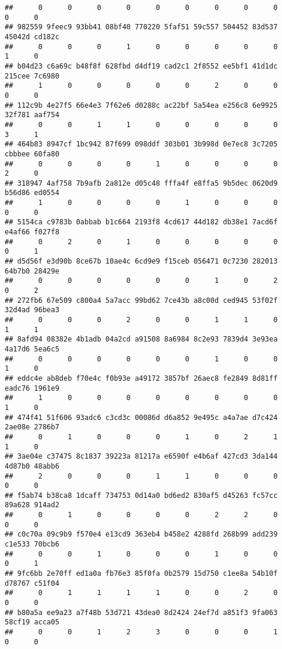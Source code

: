 \documentclass[
]{article}
\begin{document}
\begin{verbatim}
##      0      0      0      0      0      0      0      0      0      0      0 
## 982559 9feec9 93bb41 08bf40 770220 5faf51 59c557 504452 83d537 45042d cd182c 
##      0      0      0      1      0      0      0      0      0      1      0 
## b04d23 c6a69c b48f8f 628fbd d4df19 cad2c1 2f8552 ee5bf1 41d1dc 215cee 7c6980 
##      1      0      0      0      0      0      2      0      0      0      0 
## 112c9b 4e27f5 66e4e3 7f62e6 d0288c ac22bf 5a54ea e256c8 6e9925 32f781 aaf754 
##      0      0      1      1      0      0      0      0      0      3      1 
## 464b83 8947cf 1bc942 87f699 098ddf 303b01 3b998d 0e7ec8 3c7205 cbbbee 60fa80 
##      0      0      0      0      1      0      0      0      0      2      0 
## 318947 4af758 7b9afb 2a812e d05c48 fffa4f e8ffa5 9b5dec 0620d9 b56d86 ed0554 
##      1      0      0      0      0      1      0      0      0      0      0 
## 5154ca c9783b 0abbab b1c664 2193f8 4cd617 44d182 db38e1 7acd6f e4af66 f027f8 
##      0      2      0      1      0      0      0      0      0      0      1 
## d5d56f e3d90b 8ce67b 10ae4c 6cd9e9 f15ceb 056471 0c7230 282013 64b7b0 28429e 
##      0      0      0      0      0      0      1      0      2      0      2 
## 272fb6 67e509 c800a4 5a7acc 99bd62 7ce43b a8c00d ced945 53f02f 32d4ad 96bea3 
##      0      0      0      2      0      0      1      1      0      1      1 
## 8afd94 08382e 4b1adb 04a2cd a91508 8a6984 8c2e93 7839d4 3e93ea 4a17d6 5ea6c5 
##      0      0      0      0      0      0      1      0      0      1      0 
## eddc4e ab8deb f70e4c f0b93e a49172 3857bf 26aec8 fe2849 8d81ff eadc76 1961e9 
##      1      0      0      0      0      0      0      0      0      1      0 
## 474f41 51f606 93adc6 c3cd3c 00086d d6a852 9e495c a4a7ae d7c424 2ae08e 2786b7 
##      0      1      0      0      0      1      0      2      1      1      0 
## 3ae04e c37475 8c1837 39223a 81217a e6590f e4b6af 427cd3 3da144 4d87b0 48abb6 
##      2      0      0      0      1      1      0      0      0      0      0 
## f5ab74 b38ca8 1dcaff 734753 0d14a0 bd6ed2 830af5 d45263 fc57cc 89a628 914ad2 
##      0      1      0      0      0      0      2      2      0      0      0 
## c0c70a 09c9b9 f570e4 e13cd9 363eb4 b458e2 4288fd 268b99 add239 c1e533 70bcb6 
##      0      0      1      0      0      0      1      0      0      0      1 
## 9fc6bb 2e70ff ed1a0a fb76e3 85f0fa 0b2579 15d750 c1ee8a 54b10f d78767 c51f04 
##      0      1      1      1      1      0      0      2      0      0      0 
## b80a5a ee9a23 a7f48b 53d721 43dea0 8d2424 24ef7d a851f3 9fa063 58cf19 acca05 
##      0      0      1      2      3      0      0      0      1      0      0 

\end{verbatim}
\end{document}
